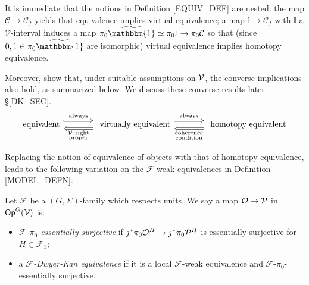 \documentclass[a4paper,10pt
,draft
]{article}%
\renewcommand{\F}{\mathcal F}
\renewcommand{\1}{\eta}%
\begin{document}
\begin{remark}
It is immediate that the notions in Definition \ref{EQUIV_DEF}
are nested: the map $\mathcal{C} \to \mathcal{C}_f$
yields that equivalence implies virtual equivalence;
a map $\mathbb{I} \to \mathcal{C}_f$
with $\mathbb{I}$ a $\mathcal{V}$-interval
induces a map
$\pi_0 \widetilde{\mathbbm{1}} \simeq \pi_0 \mathbb{I} \to \pi_0 \mathcal{C}$ so that (since $0,1 \in \pi_0 \widetilde{\mathbbm{1}}$ are isomorphic)
virtual equivalence implies homotopy equivalence.

Moreover, \cite{BM13,Cav} show that, under suitable assumptions on $\mathcal V$, the converse implications also hold, as summarized below.
We discuss these converse results {\color{red} later \S \ref{DK_SEC}}.
\[
	\begin{tikzcd}[column sep = large]
            \mbox{equivalent}
            \arrow[r, Rightarrow, shift left=2, "\mathrm{always}"]
            &
            \mbox{ virtually equivalent}
            \arrow[r, Rightarrow, shift left=2, "\mathrm{always}"]
            \arrow[l, Rightarrow, shift left = 2, "\substack{$\V\phantom{ }$\mathrm{right} \\ \mathrm{proper}}"]
            &
            \mbox{ homotopy equivalent}
            \arrow[l, Rightarrow, shift left = 2, "\substack{\mathrm{coherence} \\ \mathrm{condition}}"]
	\end{tikzcd}
\]
\end{remark}



Replacing the notion of equivalence of objects
with that of homotopy equivalence, 
leads to the following variation on the 
$\F$-weak equivalences in Definition \ref{MODEL_DEFN}. 


\begin{definition}\label{DKEQUIV_DEF}
Let $\F$ be a $(G,\Sigma)$-family which respects units.
We say a map $\mathcal{O} \to \mathcal{P}$ in $\mathsf{Op}^G(\mathcal V)$ is:
\begin{itemize}
\item \textit{$\F$-$\pi_0$-essentially surjective} if
	$j^{\**}\pi_0 \O^H \to j^{\**}\pi_0 \P^H$
	is essentially surjective for $H \in \F_1$;
\item a \textit{$\F$-Dwyer-Kan equivalence} if
	it is a local $\F$-weak equivalence and $\F$-$\pi_0$-essentially
	surjective.
\end{itemize}
\end{definition}
\end{document}
